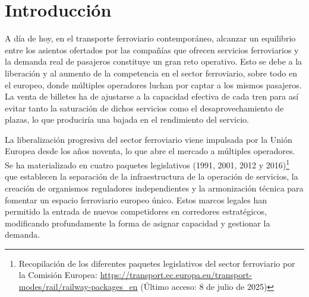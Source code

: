 \chapter{Introducción} 
\label{ch:introduccion}
A día de hoy, en el transporte ferroviario contemporáneo, alcanzar un equilibrio entre los asientos ofertados por las compañías que ofrecen servicios ferroviarios y la demanda real de pasajeros constituye un gran reto operativo. Esto se debe a la liberación y al aumento de la competencia en el sector ferroviario, sobre todo en el europeo, donde múltiples operadores luchan por captar a los mismos pasajeros. La venta de billetes ha de ajustarse a la capacidad efectiva de cada tren para así evitar tanto la saturación de dichos servicios como el desaprovechamiento de plazas, lo que produciría una bajada en el rendimiento del servicio.

La liberalización progresiva del sector ferroviario viene impulsada por la Unión Europea desde los años noventa, lo que abre el mercado a múltiples operadores. Se ha materializado en cuatro paquetes legislativos (1991, 2001, 2012 y 2016)\footnote{Recopilación de los diferentes paquetes legislativos del sector ferroviario por la Comisión Europea: \url{https://transport.ec.europa.eu/transport-modes/rail/railway-packages_en} (Último acceso: 8 de julio de 2025)} que establecen la separación de la infraestructura de la operación de servicios, la creación de organismos reguladores independientes y la armonización técnica para fomentar un espacio ferroviario europeo único. Estos marcos legales han permitido la entrada de nuevos competidores en corredores estratégicos, modificando profundamente la forma de asignar capacidad y gestionar la demanda.

